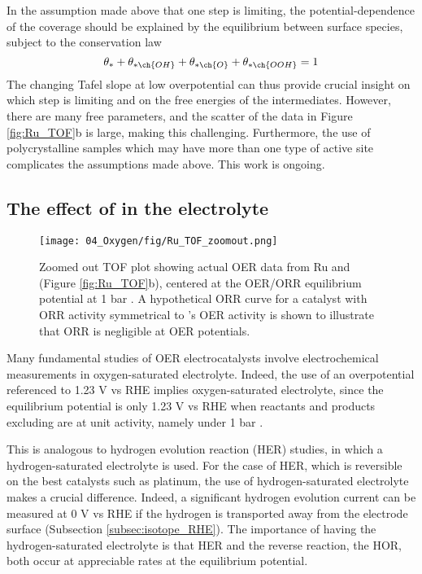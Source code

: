In the assumption made above that one step is limiting, the potential-dependence of the coverage should be explained by the equilibrium between surface species, subject to the conservation law
\begin{equation}
 \theta_{*} + \theta_{* \ch{OH}} + \theta_{* \ch{O}} + \theta_{* \ch{OOH}} = 1
\end{equation}
The changing Tafel slope at low overpotential can thus provide crucial insight on which step is limiting and on the free energies of the intermediates. However, there are many free parameters, and the scatter of the data in Figure \ref{fig:Ru_TOF}b is large, making this challenging. Furthermore, the use of polycrystalline samples which may have more than one type of active site complicates the assumptions made above. This work is ongoing.


\subsection{The effect of  in the electrolyte}
\begin{figure}[h!]
	\centering
	\texttt{[image: 04\_Oxygen/fig/Ru\_TOF\_zoomout.png]}
	\caption{Zoomed out TOF plot showing actual OER data from Ru and  (Figure \ref{fig:Ru_TOF}b), centered at the OER/ORR equilibrium potential at 1 bar . A hypothetical ORR curve for a catalyst with ORR activity symmetrical to 's OER activity is shown to illustrate that ORR is negligible at OER potentials.}
	\label{fig:Ru_TOF_zoomout}
\end{figure}

Many fundamental studies of OER electrocatalysts involve electrochemical measurements in oxygen-saturated electrolyte. Indeed, the use of an overpotential referenced to 1.23 V vs RHE implies oxygen-saturated electrolyte, since the equilibrium potential is only 1.23 V vs RHE when reactants and products excluding  are at unit activity, namely under 1 bar . 



This is analogous to hydrogen evolution reaction (HER) studies, in which a hydrogen-saturated electrolyte is used. For the case of HER, which is reversible on the best catalysts such as platinum, the use of hydrogen-saturated electrolyte makes a crucial difference. Indeed, a significant hydrogen evolution current can be measured at 0 V vs RHE if the hydrogen is transported away from the electrode surface (Subsection \ref{subsec:isotope_RHE}). The importance of having the hydrogen-saturated electrolyte is that HER and the reverse reaction, the HOR, both occur at appreciable rates at the equilibrium potential.

